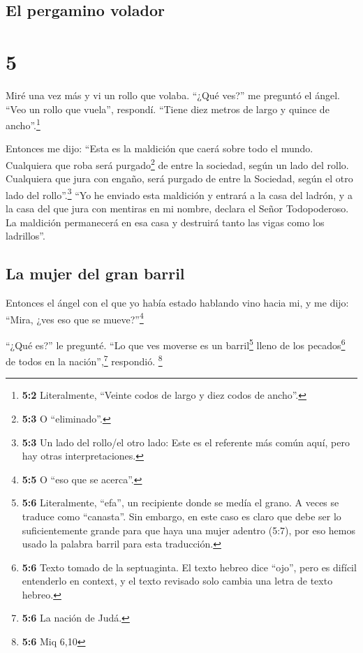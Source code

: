 \hypertarget{el-pergamino-volador}{%
\subsection{El pergamino volador}\label{el-pergamino-volador}}

\hypertarget{section-4}{%
\section{5}\label{section-4}}

 Miré una vez más y vi un rollo que volaba. 
``¿Qué ves?'' me preguntó el ángel. ``Veo un rollo que vuela'',
respondí. ``Tiene diez metros de largo y quince de ancho''.\footnote{\textbf{5:2}
  Literalmente, ``Veinte codos de largo y diez codos de ancho''.}

 Entonces me dijo: ``Esta es la maldición que caerá sobre
todo el mundo. Cualquiera que roba será purgado\footnote{\textbf{5:3} O
  ``eliminado''.} de entre la sociedad, según un lado del rollo.
Cualquiera que jura con engaño, será purgado de entre la Sociedad, según
el otro lado del rollo''.\footnote{\textbf{5:3} Un lado del rollo/el
  otro lado: Este es el referente más común aquí, pero hay otras
  interpretaciones.}  ``Yo he enviado esta maldición y
entrará a la casa del ladrón, y a la casa del que jura con mentiras en
mi nombre, declara el Señor Todopoderoso. La maldición permanecerá en
esa casa y destruirá tanto las vigas como los ladrillos''.

\hypertarget{la-mujer-del-gran-barril}{%
\subsection{La mujer del gran barril}\label{la-mujer-del-gran-barril}}

 Entonces el ángel con el que yo había estado hablando
vino hacia mi, y me dijo: ``Mira, ¿ves eso que se mueve?''\footnote{\textbf{5:5}
  O ``eso que se acerca''.}

 ``¿Qué es?'' le pregunté. ``Lo que ves moverse es un
barril\footnote{\textbf{5:6} Literalmente, ``efa'', un recipiente donde
  se medía el grano. A veces se traduce como ``canasta''. Sin embargo,
  en este caso es claro que debe ser lo suficientemente grande para que
  haya una mujer adentro (5:7), por eso hemos usado la palabra barril
  para esta traducción.} lleno de los pecados\footnote{\textbf{5:6}
  Texto tomado de la septuaginta. El texto hebreo dice ``ojo'', pero es
  difícil entenderlo en context, y el texto revisado solo cambia una
  letra de texto hebreo.} de todos en la nación'',\footnote{\textbf{5:6}
  La nación de Judá.} respondió. \footnote{\textbf{5:6} Miq 6,10}

